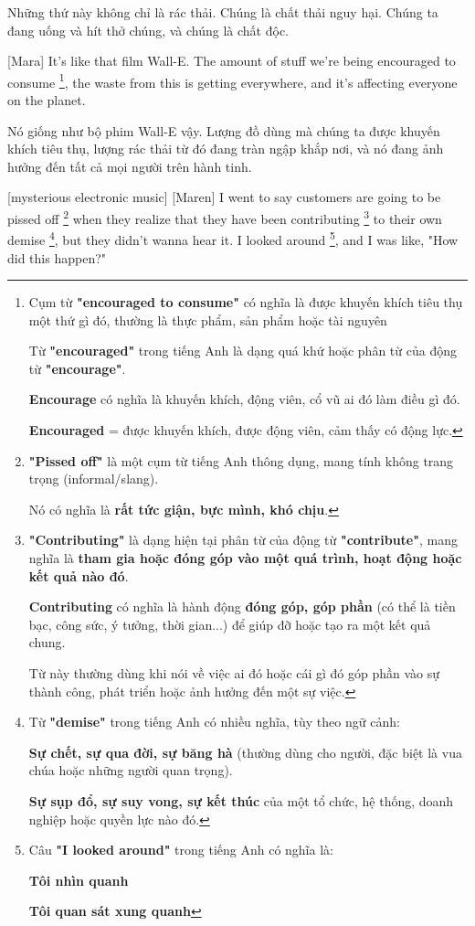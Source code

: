 \documentclass[a4paper]{article}
\begin{document}
	\begin{vietnamese-v2}
		[Jim] Những thứ này không chỉ là rác thải. Chúng là chất thải nguy hại. Chúng ta đang uống và hít thở chúng, và chúng là chất độc.
	\end{vietnamese-v2}
	
	[Mara] It's like that film Wall-E. The amount of stuff we're being encouraged to consume \footnote{
		Cụm từ \textbf{"encouraged to consume"} có nghĩa là được khuyến khích tiêu thụ một thứ gì đó, thường là thực phẩm, sản phẩm hoặc tài nguyên
	
		Từ \textbf{"encouraged"} trong tiếng Anh là dạng quá khứ hoặc phân từ của động từ \textbf{"encourage"}.
		
		\textbf{Encourage} có nghĩa là khuyến khích, động viên, cổ vũ ai đó làm điều gì đó.
		
		\textbf{Encouraged} = được khuyến khích, được động viên, cảm thấy có động lực.
	}, the waste from this is getting everywhere, and it's affecting everyone on the planet.
	
	\begin{vietnamese-v2}
		[Mara] Nó giống như bộ phim Wall-E vậy. Lượng đồ dùng mà chúng ta được khuyến khích tiêu thụ, lượng rác thải từ đó đang tràn ngập khắp nơi, và nó đang ảnh hưởng đến tất cả mọi người trên hành tinh.
	\end{vietnamese-v2}
	
	[mysterious electronic music]
	[Maren] I went to say customers are going to be pissed off \footnote{
		\textbf{"Pissed off"} là một cụm từ tiếng Anh thông dụng, mang tính không trang trọng (informal/slang).
	
		Nó có nghĩa là \textbf{rất tức giận, bực mình, khó chịu}.
	} when they realize that they have been contributing \footnote{
		\textbf{"Contributing"} là dạng hiện tại phân từ của động từ \textbf{"contribute"}, mang nghĩa là \textbf{tham gia hoặc đóng góp vào một quá trình, hoạt động hoặc kết quả nào đó}.
		
		\textbf{Contributing} có nghĩa là hành động \textbf{đóng góp, góp phần} (có thể là tiền bạc, công sức, ý tưởng, thời gian...) để giúp đỡ hoặc tạo ra một kết quả chung.
		
		Từ này thường dùng khi nói về việc ai đó hoặc cái gì đó góp phần vào sự thành công, phát triển hoặc ảnh hưởng đến một sự việc.
	
	} to their own demise \footnote{
		Từ \textbf{"demise"} trong tiếng Anh có nhiều nghĩa, tùy theo ngữ cảnh:
	
			\textbf{Sự chết, sự qua đời, sự băng hà} (thường dùng cho người, đặc biệt là vua chúa hoặc những người quan trọng).
			
			\textbf{Sự sụp đổ, sự suy vong, sự kết thúc} của một tổ chức, hệ thống, doanh nghiệp hoặc quyền lực nào đó.
	
	}, but they didn't wanna hear it. I looked around \footnote{
		Câu \textbf{"I looked around"} trong tiếng Anh có nghĩa là:
		
			\textbf{Tôi nhìn quanh}
			
			\textbf{Tôi quan sát xung quanh}
	
	}, and I was like, "How did this happen?" 
	
\end{document}
